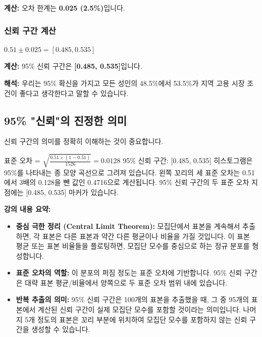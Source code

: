 \documentclass[11pt,a4paper]{article}
\begin{document}
\textbf{계산:}
오차 한계는 \textbf{0.025 (2.5\%)}입니다.

\subsubsection{신뢰 구간 계산}

\begin{tcolorbox}[title=슬라이드 71: 지역 고용 시장 조건이 좋은가? (2/2)]
$0.51 \pm 0.025 = [0.485, 0.535]$
\end{tcolorbox}

\textbf{계산:}
95\% 신뢰 구간은 \textbf{[0.485, 0.535]}입니다.

\textbf{해석:}
우리는 95\% 확신을 가지고 모든 성인의 48.5\%에서 53.5\%가 지역 고용 시장 조건이 좋다고 생각한다고 말할 수 있습니다.

\subsection{95\% "신뢰"의 진정한 의미}

신뢰 구간의 의미를 정확히 이해하는 것이 중요합니다.

\begin{tcolorbox}[title=슬라이드 72: 95\% "신뢰"는 실제로 무엇을 의미하는가?]
표준 오차 = $\sqrt{\frac{0.51 \times (1-0.51)}{1526}} = 0.0128$
95\% 신뢰 구간: [0.485, 0.535]
히스토그램은 95\%를 나타내는 종 모양 곡선으로 그려져 있습니다. 왼쪽 꼬리의 세 표준 오차는 0.51에서 3배의 0.128을 뺀 값인 0.4716으로 계산됩니다. 95\% 신뢰 구간의 두 표준 오차 지점에는 [0.485, 0.535] 마커가 있습니다.
\end{tcolorbox}

\textbf{강의 내용 요약:}
\begin{itemize}
    \item \textbf{중심 극한 정리 (Central Limit Theorem):} 모집단에서 표본을 계속해서 추출하면, 각 표본은 다른 표본과 약간 다른 평균이나 비율을 가질 것입니다. 이 표본 평균 또는 표본 비율들을 플로팅하면, 모집단 모수를 중심으로 하는 정규 분포를 형성합니다.
    \item \textbf{표준 오차의 역할:} 이 분포의 퍼짐 정도는 표준 오차에 기반합니다. 95\% 신뢰 구간은 대략 표본 평균/비율에서 양쪽으로 두 표준 오차 범위 내에 있습니다.
    \item \textbf{반복 추출의 의미:} 95\% 신뢰 구간은 100개의 표본을 추출했을 때, 그 중 95개의 표본에서 계산된 신뢰 구간이 실제 모집단 모수를 포함할 것이라는 의미입니다. 나머지 5개 정도의 표본은 꼬리 부분에 위치하여 모집단 모수를 포함하지 않는 신뢰 구간을 생성할 수 있습니다.
\end{itemize}
\end{document}
